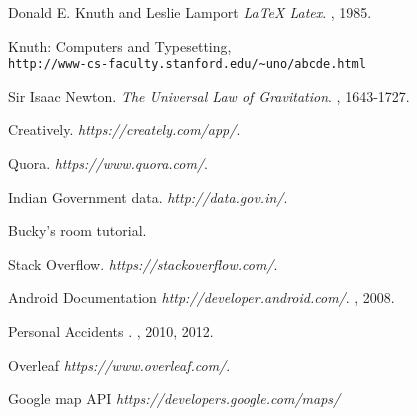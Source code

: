 \begin{thebibliography}{9}
Donald E. Knuth and Leslie Lamport
\textit{\LaTeX\- Latex}. 
, 1985.

Knuth: Computers and Typesetting,
\\\texttt{http://www-cs-faculty.stanford.edu/\~{}uno/abcde.html}

Sir Isaac Newton. 
\textit{The 
Universal Law of Gravitation}. 
, 1643-1727.

Creatively. 
\textit{https://creately.com/app/}. 


Quora. 
\textit{https://www.quora.com/}. 

Indian Government data. 
\textit{http://data.gov.in/}. 

Bucky's room tutorial. 

Stack Overflow. 
\textit{https://stackoverflow.com/}. 

Android Documentation 
\textit{http://developer.android.com/}. 
, 2008.

Personal Accidents
\textit{}. 
, 2010, 2012.

Overleaf
\textit{https://www.overleaf.com/}. 

Google map API
\textit{https://developers.google.com/maps/}

\end{thebibliography}